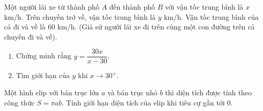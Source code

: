 \begin{vd}%
Một người lái xe từ thành phố $A$ đến thành phố $B$ với vận tốc trung bình  là $x$ km/h. Trên chuyến trở về, vận tốc trung bình là $y$ km/h. Vận tốc trung bình của cả đi và về là $60$ km/h. (Giả sử người lái xe đi trên cùng  một con đường trên cả chuyến đi và về).
\begin{enumerate}
\item Chứng minh rằng $y= \dfrac{30x}{x-30}$.
\item Tìm giới hạn của $y$ khi $x \rightarrow 30^{+}$.
\end{enumerate}
\end{vd}


\begin{vd}%
Một hình elip với bán trục lớn $a$ và bán trục nhỏ $b$ thì diện tích được tính theo công thức $S=\pi ab$. Tính giới hạn diện tích của elip khi tiêu cự gần tới $0$.
\end{vd}

